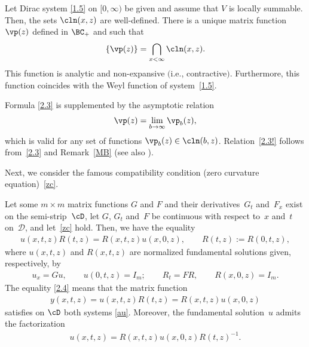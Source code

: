  \begin{Proposition} \label{PnW1} Let Dirac system \eqref{1.5} on $[0, \infty)$
 be given and assume that $V$ is locally summable.
 Then, the sets $\cln(x,z)$
 are well-defined. There is a unique matrix function
 $\vp(z)$ defined in $\BC_+$ and such that
\begin{gather}  \label{2.3}
\{\vp(z) \}=\bigcap_{x<\infty}\cln(x,z).
\end{gather}
This function is analytic and non-expansive $($i.e., contractive$)$.
Furthermore, this function coincides with the Weyl function of system~\eqref{1.5}.
 \end{Proposition}

Formula \eqref{2.3} is supplemented by the asymptotic relation
\begin{gather}  \label{2.3!}
\vp(z)=\lim_{b \to \infty}\vp_b(z),
\end{gather}
which is valid for any set of functions $\vp_b(z)\in \cln(b,z)$. Relation~\eqref{2.3!} follows from~\eqref{2.3}
and Remark~\ref{MB} (see also \cite[Remark~2.24]{SaSaR}).

Next, we consider the famous compatibility condition (zero curvature equation)~\eqref{zc}.
\begin{Proposition} \label{TmM}
Let some $m \times m$ matrix functions $G$ and $F$ and their derivatives~$G_t$ and~$F_x$ exist on the semi-strip~$\cD$,
let $G$, $G_t$ and~$F$ be continuous with respect to~$x$ and~$t$ on~$\mathcal{D}$,
 and let~\eqref{zc}
hold. Then, we have the equality
\begin{gather} \label{2.4}
u(x,t,z)R(t,z)=R(x,t,z)u(x,0,z), \qquad R(t,z):=R(0,t,z),
\end{gather}
where $u(x,t,z)$ and $R(x,t,z)$ are normalized fundamental solutions given, respectively, by
\begin{gather} \label{2.5}
u_x=Gu, \qquad u(0,t,z)=I_m; \qquad R_t=FR, \qquad R(x,0,z)=I_m.
\end{gather}
The equality \eqref{2.4} means that the matrix function
\begin{gather*}
y(x,t,z)=u(x,t,z)R(t,z)=R(x,t,z)u(x,0,z)
\end{gather*}
satisf\/ies on $\cD$ both systems \eqref{au}. Moreover, the fundamental solution~$u$ admits the factorization
\begin{gather} \label{2.6}
u(x,t,z)=R(x,t,z)u(x,0,z)R(t,z)^{-1}.
\end{gather}
\end{Proposition}

